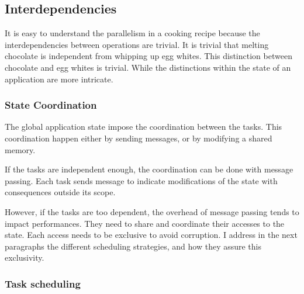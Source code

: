 
\subsection{Interdependencies}

It is easy to understand the parallelism in a cooking recipe because the interdependencies between operations are trivial.
It is trivial that melting chocolate is independent from whipping up egg whites.
This distinction between chocolate and egg whites is trivial.
While the distinctions within the state of an application are more intricate.

\subsubsection{State Coordination}

The global application state impose the coordination between the tasks.
This coordination happen either by sending messages, or by modifying a shared memory.

If the tasks are independent enough, the coordination can be done with message passing.
Each task sends message to indicate modifications of the state with consequences outside its scope.

However, if the tasks are too dependent, the overhead of message passing tends to impact performances.
They need to share and coordinate their accesses to the state.
Each access needs to be exclusive to avoid corruption.
I address in the next paragraphs the different scheduling strategies, and how they assure this exclusivity.

\subsubsection{Task scheduling}

